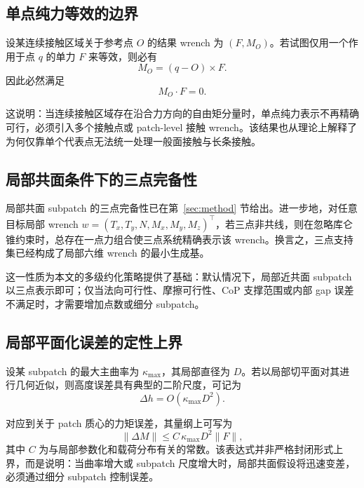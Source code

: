 \label{sec:analysis}

\subsection{单点纯力等效的边界}

设某连续接触区域关于参考点 $O$ 的结果 wrench 为 $(F,M_O)$。若试图仅用一个作用于点 $q$ 的单力 $F$ 来等效，则必有
\begin{equation}
M_O = (q-O)\times F.
\end{equation}
因此必然满足
\begin{equation}
M_O \cdot F = 0.
\end{equation}

这说明：当连续接触区域存在沿合力方向的自由矩分量时，单点纯力表示不再精确可行，必须引入多个接触点或 patch-level 接触 wrench。该结果也从理论上解释了为何仅靠单个代表点无法统一处理一般面接触与长条接触。

\subsection{局部共面条件下的三点完备性}

局部共面 subpatch 的三点完备性已在第~\ref{sec:method} 节给出。进一步地，对任意目标局部 wrench $w=(T_x,T_y,N,M_x,M_y,M_z)^\top$，若三点非共线，则在忽略库仑锥约束时，总存在一点力组合使三点系统精确表示该 wrench。换言之，三点支持集已经构成了局部六维 wrench 的最小生成基。

这一性质为本文的多级约化策略提供了基础：默认情况下，局部近共面 subpatch 以三点表示即可；仅当法向可行性、摩擦可行性、CoP 支撑范围或内部 gap 误差不满足时，才需要增加点数或细分 subpatch。

\subsection{局部平面化误差的定性上界}

设某 subpatch 的最大主曲率为 $\kappa_{\max}$，其局部直径为 $D$。若以局部切平面对其进行几何近似，则高度误差具有典型的二阶尺度，可记为
\begin{equation}
\Delta h = O(\kappa_{\max} D^2).
\end{equation}

对应到关于 patch 质心的力矩误差，其量纲上可写为
\begin{equation}
\|\Delta M\| \le C\,\kappa_{\max}D^2\|F\|,
\end{equation}
其中 $C$ 为与局部参数化和载荷分布有关的常数。该表达式并非严格封闭形式上界，而是说明：当曲率增大或 subpatch 尺度增大时，局部共面假设将迅速变差，必须通过细分 subpatch 控制误差。

